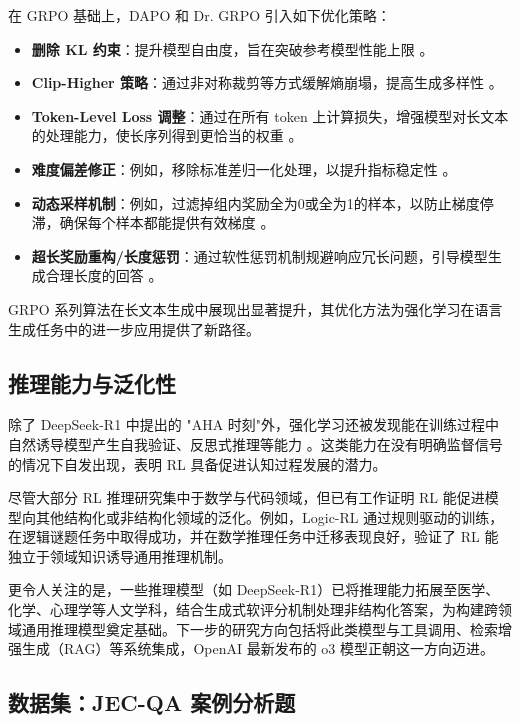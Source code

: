 \documentclass{pkuthesis}
\begin{document}
在 GRPO 基础上，DAPO 和 Dr. GRPO 引入如下优化策略：
\begin{itemize}
    \item \textbf{删除 KL 约束}：提升模型自由度，旨在突破参考模型性能上限 \cite{yu2025dapo}。
    \item \textbf{Clip-Higher 策略}：通过非对称裁剪等方式缓解熵崩塌，提高生成多样性 \cite{yu2025dapo}。
    \item \textbf{Token-Level Loss 调整}：通过在所有 token 上计算损失，增强模型对长文本的处理能力，使长序列得到更恰当的权重 \cite{yu2025dapo}。
    \item \textbf{难度偏差修正}：例如，移除标准差归一化处理，以提升指标稳定性 \cite{liu2025understanding}。
    \item \textbf{动态采样机制}：例如，过滤掉组内奖励全为0或全为1的样本，以防止梯度停滞，确保每个样本都能提供有效梯度 \cite{yu2025dapo}。
    \item \textbf{超长奖励重构/长度惩罚}：通过软性惩罚机制规避响应冗长问题，引导模型生成合理长度的回答 \cite{yu2025dapo}。
\end{itemize}

GRPO 系列算法在长文本生成中展现出显著提升，其优化方法为强化学习在语言生成任务中的进一步应用提供了新路径。

\subsection{推理能力与泛化性}

除了 DeepSeek-R1 中提出的 "AHA 时刻"外，强化学习还被发现能在训练过程中自然诱导模型产生自我验证、反思式推理等能力 \cite{el2025competitive}。这类能力在没有明确监督信号的情况下自发出现，表明 RL 具备促进认知过程发展的潜力。

尽管大部分 RL 推理研究集中于数学与代码领域，但已有工作证明 RL 能促进模型向其他结构化或非结构化领域的泛化。例如，Logic-RL\cite{xie2025logic} 通过规则驱动的训练，在逻辑谜题任务中取得成功，并在数学推理任务中迁移表现良好，验证了 RL 能独立于领域知识诱导通用推理机制。

更令人关注的是，一些推理模型（如 DeepSeek-R1\cite{guo2025deepseek}）已将推理能力拓展至医学、化学、心理学等人文学科，结合生成式软评分机制处理非结构化答案，为构建跨领域通用推理模型奠定基础。下一步的研究方向包括将此类模型与工具调用、检索增强生成（RAG）等系统集成，OpenAI 最新发布的 o3 模型正朝这一方向迈进。

\subsection{数据集：JEC-QA 案例分析题}
\end{document}
